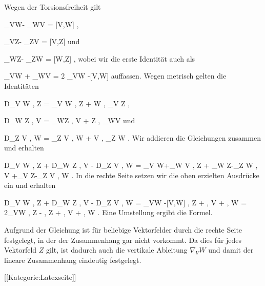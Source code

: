 {

Wegen der Torsionsfreiheit gilt

\mavergleichskettedisp
{\vergleichskette
{ \nabla_VW- \nabla_WV
}
{ =} { [V,W]
}
{ } {
}
{ } {
}
{ } {
}
}
{}{}{,}

\mavergleichskettedisp
{\vergleichskette
{ \nabla_VZ- \nabla_ZV
}
{ =} { [V,Z]
}
{ } {
}
{ } {
}
{ } {
}
}
{}{}{}
und

\mavergleichskettedisp
{\vergleichskette
{ \nabla_WZ- \nabla_ZW
}
{ =} { [W,Z]
}
{ } {
}
{ } {
}
{ } {
}
}
{}{}{,}
wobei wir die erste Identität auch als

\mavergleichskettedisp
{\vergleichskette
{ \nabla_VW + \nabla_WV
}
{ =} { 2 \nabla_VW -[V,W]
}
{ } {
}
{ } {
}
{ } {
}
}
{}{}{}
auffassen. Wegen metrisch gelten die Identitäten

\mavergleichskettedisp
{\vergleichskette
{ D_V \left\langle  W  ,  Z  \right\rangle
}
{ =} { \left\langle \nabla_V W , Z  \right\rangle  + \left\langle  W  ,  \nabla_V Z  \right\rangle
}
{ } {
}
{ } {
}
{ } {
}
}
{}{}{,}

\mavergleichskettedisp
{\vergleichskette
{ D_W \left\langle  Z  ,  V  \right\rangle
}
{ =} { \left\langle \nabla_WZ , V  \right\rangle  + \left\langle  Z  ,  \nabla_WV  \right\rangle
}
{ } {
}
{ } {
}
{ } {
}
}
{}{}{}
und

\mavergleichskettedisp
{\vergleichskette
{ D_Z \left\langle  V  ,  W  \right\rangle
}
{ =} { \left\langle \nabla_Z V , W  \right\rangle  + \left\langle  V  ,  \nabla_Z W   \right\rangle
}
{ } {
}
{ } {
}
{ } {
}
}
{}{}{.}
Wir addieren die Gleichungen zusammen und erhalten

\mavergleichskettedisphandlinks
{\vergleichskettedisphandlinks
{ D_V \left\langle  W  ,  Z  \right\rangle+ D_W \left\langle  Z  ,  V  \right\rangle  - D_Z \left\langle  V  ,  W  \right\rangle
}
{ =} { \left\langle \nabla_V W+\nabla_W V  ,  Z  \right\rangle + \left\langle \nabla_W Z-\nabla_Z W   ,  V  \right\rangle+\left\langle  \nabla_V Z-\nabla_Z V   ,  W  \right\rangle
}
{ } {
}
{ } {
}
{ } {
}
}
{}{}{.}
In die rechte Seite setzen wir die oben erzielten Ausdrücke ein und erhalten

\mavergleichskettealignhandlinks
{\vergleichskettealignhandlinks
{ D_V \left\langle  W  ,  Z  \right\rangle+ D_W \left\langle  Z  ,  V  \right\rangle  - D_Z \left\langle  V  ,  W  \right\rangle
}
{ =} { \left{} \nabla_VW -[V,W]  ,  Z  \right\rangle + \left\langle  [W,Z]  ,  V  \right\rangle + \left\langle [V,Z]   ,  W  \right\rangle
}
{ =} { 2\left\langle  \nabla_VW   ,  Z  \right\rangle - \left\langle  [V,W]  ,  Z  \right\rangle + \left\langle  [W,Z]  ,  V  \right\rangle + \left\langle  [V,Z]   ,  W  \right\rangle
}
{ } {
}
{ } {
}
}
{}
{}{.}
Eine Umstellung ergibt die Formel.

Aufgrund der Gleichung ist
 für beliebige Vektorfelder durch die rechte Seite festgelegt, in der der Zusammenhang gar nicht vorkommt. Da dies für jedes Vektorfeld $Z$ gilt, ist dadurch auch die vertikale Ableitung $\nabla_V W$ und damit der lineare Zusammenhang eindeutig festgelegt.

 }

 [[Kategorie:Latexseite]]
